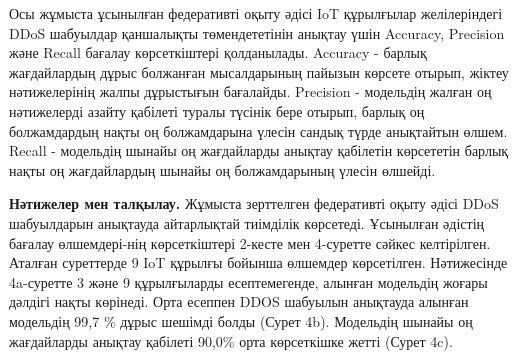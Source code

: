 \begin{multicols}{2}


Осы жұмыста ұсынылған федеративті оқыту әдісі IoT құрылғылар
желілеріндегі DDoS шабуылдар қаншалықты төмендететінін анықтау үшін
Accuracy, Precision және Recall бағалау көрсеткіштері қолданылады.
Accuracy - барлық жағдайлардың дұрыс болжанған мысалдарының пайызын
көрсете отырып, жіктеу нәтижелерінің жалпы дұрыстығын бағалайды.
Precision - модельдің жалған оң нәтижелерді азайту қабілеті туралы
түсінік бере отырып, барлық оң болжамдардың нақты оң болжамдарына үлесін
сандық түрде анықтайтын өлшем. Recall - модельдің шынайы оң жағдайларды
анықтау қабілетін көрсететін барлық нақты оң жағдайлардың шынайы оң
болжамдарының үлесін өлшейді.

{\bfseries Нәтижелер мен талқылау.} Жұмыста зерттелген федеративті оқыту
әдісі DDoS шабуылдарын анықтауда айтарлықтай тиімділік көрсетеді.
Ұсынылған әдістің бағалау өлшемдері-нің көрсеткіштері 2-кесте мен
4-суретте сәйкес келтірілген. Аталған суреттерде 9 IoT құрылғы бойынша
өлшемдер көрсетілген. Нәтижесінде 4a-суретте 3 және 9 құрылғыларды
есептемегенде, алынған модельдің жоғары дәлдігі нақты көрінеді. Орта
есеппен DDOS шабуылын анықтауда алынған модельдің 99,7 \% дұрыс шешімді
болды (Сурет 4b). Модельдің шынайы оң жағдайларды анықтау қабілеті
90,0\% орта көрсеткішке жетті (Сурет 4c).
\end{multicols}

